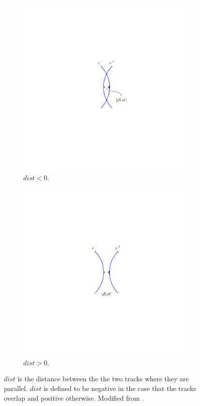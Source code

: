 \begin{figure}[htbp]
  \centering
  \begin{subfigure}{0.45\textwidth}
    \centering
    \includegraphics[trim = 40mm 40mm 40mm 40mm, clip,width=\textwidth]{dist_m}
    \caption{$dist<0$.}
    \label{fig:dist_m}
  \end{subfigure}
  \begin{subfigure}{0.45\textwidth}
    \centering
    \includegraphics[trim = 40mm 40mm 40mm 40mm, clip,width=\textwidth]{dist_p}
    \caption{$dist>0$.}
    \label{fig:dist_p}
  \end{subfigure}
  \caption{$dist$ is the distance between the the two tracks where they are
parallel. $dist$ is defined to be negative in the case that the tracks overlap
and positive otherwise. Modified from \cite{eConver}.} 
\label{fig:dist}
\end{figure}
